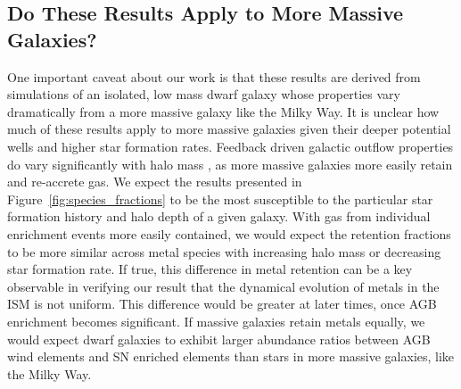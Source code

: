 \documentclass[twocolumn]{aastex61}
\begin{document}
\subsection{Do These Results Apply to More Massive Galaxies?}
\label{sec:massive galaxies}
One important caveat about our work is that these results are derived from simulations of an isolated, low mass dwarf galaxy whose properties vary dramatically from a more massive galaxy like the Milky Way. It is unclear how much of these results apply to more massive galaxies given their deeper potential wells and higher star formation rates. Feedback driven galactic outflow properties do vary significantly with halo mass \citep[e.g.][]{MacLowFerrara1999,Muratov2017}, as more massive galaxies more easily retain and re-accrete gas. We expect the results presented in Figure~\ref{fig:species_fractions} to be the most susceptible to the particular star formation history and halo depth of a given galaxy. With gas from individual enrichment events more easily contained, we would expect the retention fractions to be more similar across metal species with increasing halo mass or decreasing star formation rate. If true, this difference in metal retention can be a key observable in verifying our result that the dynamical evolution of metals in the ISM is not uniform. 
This difference would be greater at later times, once AGB enrichment becomes significant. 
If massive galaxies retain metals equally, we would expect dwarf galaxies to exhibit larger abundance ratios between AGB wind elements and SN enriched elements than stars in more massive galaxies, like the Milky Way.
\end{document}
